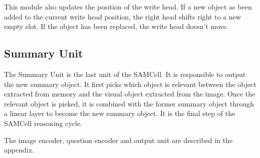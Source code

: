 This module also updates the position of the write head. If a new object as been added to the current write head position, the right head shifts right to a new empty slot. If the object has been replaced, the write head doesn't move.

\subsection{Summary  Unit}

The  Summary Unit is the last unit of the SAMCell. It is responsible to output the new summary object. It first picks which object is relevant between the object extracted from memory and the visual object extracted from the image. Once the relevant object is picked, it is combined with the former summary object through a linear layer to become the new summary object. It is the final step of the SAMCell reasoning cycle. 

The image encoder, question encoder and output unit are described in the appendix.
